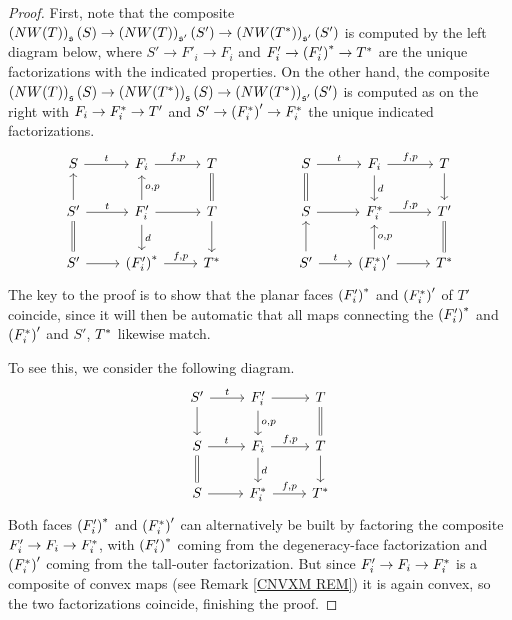 \documentclass[a4paper,10pt
,draft
]{article}%
\numberwithin{equation}{section}
\numberwithin{figure}{section}
\theoremstyle{definition} %
\newcommand{\1}{\ensuremath{\mathbbm 1}}%
\begin{document}
\begin{proof}
First, note that the composite
$\left(NW(T)\right)_{\mathfrak{s}}({S})
\to 
\left(NW(T)\right)_{\mathfrak{s}'}({S'})
\to 
\left(NW(T^{\**})\right)_{\mathfrak{s}'}({S'})$
is computed by the left diagram below,
where
$S' \to F'_i \to F_i$
and 
$F'_i \to \left(F_i'\right)^{\**} \to T^{\**}$
are the unique factorizations with the indicated properties.
On the other hand, the composite
$\left(NW(T)\right)_{\mathfrak{s}}(S)
\to 
\left(NW(T^{\**})\right)_{\mathfrak{s}}(S)
\to 
\left(NW(T^{\**})\right)_{\mathfrak{s}'}(S')$
is computed as on the right
with 
$F_i \to F^{\**}_i \to T'$ and
$S' \to \left(F_i^{\**}\right)' \to F^{\**}_i$
the unique indicated factorizations.
\begin{equation}
\begin{tikzcd}
	S \ar{r}{t} 
&
	F_i \ar{r}{f,p} 
&
	T \ar[equal]{d}
&&%
	S \ar{r}{t} \ar[equal]{d}
&
	F_i \ar{r}{f,p} \ar{d}{d}
&
	T \ar{d}
\\
	S' \ar{u} \ar{r}{t} \ar[equal]{d}
&
	F'_i \ar{r} \arrow{u}[swap]{o,p} \arrow{d}{d}
&
	T \ar{d}
&&%
	S \ar{r}
&
	F^{\**}_i \arrow{r}{f,p}
&
	T' \ar[equal]{d}
\\
	S' \ar{r}
&
	\left(F_i'\right)^{\**} \arrow{r}{f,p}
&
	T^{\**}
&&%
	S' \arrow{r}{t} \ar{u}
&
	\left(F_i^{\**}\right)' \ar{r} \arrow{u}[swap]{o,p}
&
	T^{\**}
\end{tikzcd}
\end{equation}
The key to the proof is to show
that the planar faces 
$\left(F_i'\right)^{\**}$ and
$\left(F_i^{\**}\right)'$
of $T'$
coincide, since it will then be automatic that all maps connecting the
$\left(F_i'\right)^{\**}$ and
$\left(F_i^{\**}\right)'$
and $S'$, $T^{\**}$
likewise match.

To see this, we consider the following diagram.
\begin{equation}
\begin{tikzcd}
	S' \ar{r}{t} \ar{d}
&
	F'_i \ar{r} \ar{d}{o,p}
&
	T \ar[equal]{d}
\\
	S  \ar{r}{t} \ar[equal]{d}
&
	F_i \ar{r}{f,p}  \ar{d}{d}
&
	T \ar{d}
\\
	S \ar{r}
&
	F_i^{\**} \ar{r}{f,p}
&
	T^{\**}
\end{tikzcd}
\end{equation}
Both faces  
$\left(F'_i\right)^{\**}$ and 
$\left(F^{\**}_i\right)'
$
can alternatively be built by factoring
the composite 
$F'_i \to F_i \to F_i^{\**}$,
with 
$\left(F'_i\right)^{\**}$ 
coming from the 
degeneracy-face factorization
and 
$\left(F^{\**}_i\right)'
$
coming from the 
tall-outer factorization.
But since 
$F'_i \to F_i \to F_i^{\**}$
is a composite of convex maps 
(see Remark \ref{CNVXM REM})
it is again convex, 
so the two factorizations coincide, 
finishing the proof.
\end{proof}
\end{document}
